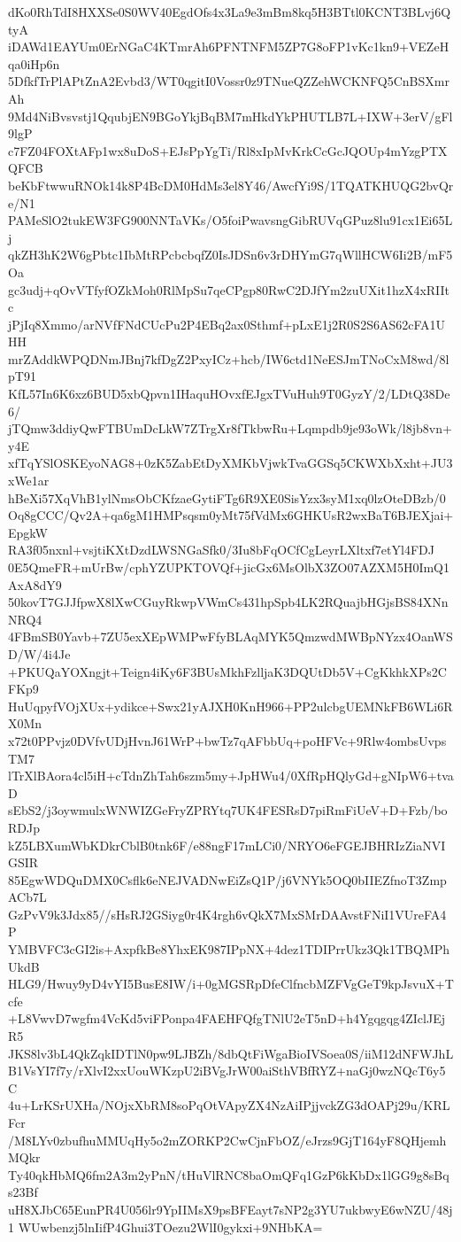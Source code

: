 dKo0RhTdI8HXXSe0S0WV40EgdOfs4x3La9e3mBm8kq5H3BTtl0KCNT3BLvj6QtyA
iDAWd1EAYUm0ErNGaC4KTmrAh6PFNTNFM5ZP7G8oFP1vKc1kn9+VEZeHqa0iHp6n
5DfkfTrPlAPtZnA2Evbd3/WT0qgitI0Vossr0z9TNueQZZehWCKNFQ5CnBSXmrAh
9Md4NiBvsvstj1QqubjEN9BGoYkjBqBM7mHkdYkPHUTLB7L+IXW+3erV/gFl9lgP
c7FZ04FOXtAFp1wx8uDoS+EJsPpYgTi/Rl8xIpMvKrkCcGcJQOUp4mYzgPTXQFCB
beKbFtwwuRNOk14k8P4BcDM0HdMs3el8Y46/AwcfYi9S/1TQATKHUQG2bvQre/N1
PAMeSlO2tukEW3FG900NNTaVKs/O5foiPwavsngGibRUVqGPuz8lu91cx1Ei65Lj
qkZH3hK2W6gPbtc1IbMtRPcbcbqfZ0IsJDSn6v3rDHYmG7qWllHCW6Ii2B/mF5Oa
gc3udj+qOvVTfyfOZkMoh0RlMpSu7qeCPgp80RwC2DJfYm2zuUXit1hzX4xRIItc
jPjIq8Xmmo/arNVfFNdCUcPu2P4EBq2ax0Sthmf+pLxE1j2R0S2S6AS62cFA1UHH
mrZAddkWPQDNmJBnj7kfDgZ2PxyICz+hcb/IW6ctd1NeESJmTNoCxM8wd/8lpT91
KfL57In6K6xz6BUD5xbQpvn1IHaquHOvxfEJgxTVuHuh9T0GyzY/2/LDtQ38De6/
jTQmw3ddiyQwFTBUmDcLkW7ZTrgXr8fTkbwRu+Lqmpdb9je93oWk/l8jb8vn+y4E
xfTqYSlOSKEyoNAG8+0zK5ZabEtDyXMKbVjwkTvaGGSq5CKWXbXxht+JU3xWe1ar
hBeXi57XqVhB1ylNmsObCKfzaeGytiFTg6R9XE0SisYzx3syM1xq0lzOteDBzb/0
Oq8gCCC/Qv2A+qa6gM1HMPsqsm0yMt75fVdMx6GHKUsR2wxBaT6BJEXjai+EpgkW
RA3f05nxnl+vsjtiKXtDzdLWSNGaSfk0/3Iu8bFqOCfCgLeyrLXltxf7etYl4FDJ
0E5QmeFR+mUrBw/cphYZUPKTOVQf+jicGx6MsOlbX3ZO07AZXM5H0ImQ1AxA8dY9
50kovT7GJJfpwX8lXwCGuyRkwpVWmCs431hpSpb4LK2RQuajbHGjsBS84XNnNRQ4
4FBmSB0Yavb+7ZU5exXEpWMPwFfyBLAqMYK5QmzwdMWBpNYzx4OanWSD/W/4i4Je
+PKUQaYOXngjt+Teign4iKy6F3BUsMkhFzlljaK3DQUtDb5V+CgKkhkXPs2CFKp9
HuUqpyfVOjXUx+ydikce+Swx21yAJXH0KnH966+PP2ulcbgUEMNkFB6WLi6RX0Mn
x72t0PPvjz0DVfvUDjHvnJ61WrP+bwTz7qAFbbUq+poHFVc+9Rlw4ombsUvpsTM7
lTrXlBAora4cl5iH+cTdnZhTah6szm5my+JpHWu4/0XfRpHQlyGd+gNIpW6+tvaD
sEbS2/j3oywmulxWNWIZGeFryZPRYtq7UK4FESRsD7piRmFiUeV+D+Fzb/boRDJp
kZ5LBXumWbKDkrCblB0tnk6F/e88ngF17mLCi0/NRYO6eFGEJBHRIzZiaNVIGSIR
85EgwWDQuDMX0Csflk6eNEJVADNwEiZsQ1P/j6VNYk5OQ0bIIEZfnoT3ZmpACb7L
GzPvV9k3Jdx85//sHsRJ2GSiyg0r4K4rgh6vQkX7MxSMrDAAvstFNiI1VUreFA4P
YMBVFC3cGI2is+AxpfkBe8YhxEK987IPpNX+4dez1TDIPrrUkz3Qk1TBQMPhUkdB
HLG9/Hwuy9yD4vYI5BusE8IW/i+0gMGSRpDfeClfncbMZFVgGeT9kpJsvuX+Tcfe
+L8VwvD7wgfm4VcKd5viFPonpa4FAEHFQfgTNlU2eT5nD+h4Ygqgqg4ZIclJEjR5
JKS8lv3bL4QkZqkIDTlN0pw9LJBZh/8dbQtFiWgaBioIVSoea0S/iiM12dNFWJhL
B1VsYI7f7y/rXlvI2xxUouWKzpU2iBVgJrW00aiSthVBfRYZ+naGj0wzNQcT6y5C
4u+LrKSrUXHa/NOjxXbRM8soPqOtVApyZX4NzAiIPjjvckZG3dOAPj29u/KRLFcr
/M8LYv0zbufhuMMUqHy5o2mZORKP2CwCjnFbOZ/eJrzs9GjT164yF8QHjemhMQkr
Ty40qkHbMQ6fm2A3m2yPnN/tHuVlRNC8baOmQFq1GzP6kKbDx1lGG9g8sBqs23Bf
uH8XJbC65EunPR4U056lr9YpIIMsX9psBFEayt7sNP2g3YU7ukbwyE6wNZU/48j1
WUwbenzj5lnIifP4Ghui3TOezu2WlI0gykxi+9NHbKA=

